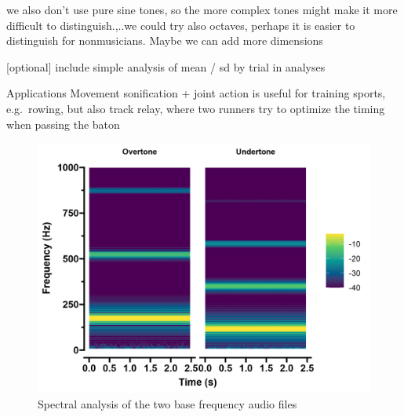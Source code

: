 \documentclass[10pt,a4paper,onecolumn]{article}
\begin{document}
we also don't use pure sine tones, so the more complex tones might make it more difficult to distinguish.,..we could try also octaves, perhaps it is easier to distinguish for nonmusicians.
Maybe we can add more dimensions

{[}optional{]} include simple analysis of mean / sd by trial in analyses

Applications
Movement sonification + joint action is useful for training sports, e.g.~rowing, but also track relay, where two runners try to optimize the timing when passing the baton

\begin{figure}[h]

{\centering \includegraphics[width=1\linewidth]{figures/spec_tones} 

}

\caption{Spectral analysis of the two base frequency audio files}\label{fig:stimuli-spectra}
\end{figure}
\balance
\clearpage


\printbibliography[title=References,heading=bibintoc]
\end{document}
